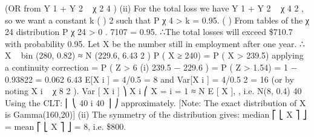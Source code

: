 \documentclass[a4paper,12pt]{article}
\begin{document}
(OR from Y 1 + Y 2 ~ χ 2 4 )
(ii)
For the total loss we have Y 1 + Y 2 ~ χ 4 2 , so we want a constant k
(
)
2
such that P χ 4 > k = 0.95.
(
)
From tables of the χ 24 distribution P χ 24 > 0 . 7107 = 0.95.
∴The total losses will exceed \$710.7 with probability 0.95.
Let X be the number still in employment after one year.
∴ X ~ bin (280, 0.82) ≈ N (229.6, 6.43 2 )
P ( X ≥ 240) = P ( X > 239.5) applying a continuity correction
= P ( Z >
6
(i)
239.5 − 229.6
) = P ( Z > 1.54) = 1 − 0.93822 = 0.062
6.43
E[X i ] = 4/0.5 = 8 and Var[X i ] = 4/0.5 2 = 16 (or by noting X i ~ χ 8 2 ).
Var [ X i ] ⎞
\sigma X i ⎛
X = i = 1 ≈ N E [ X ],
, i.e. N(8, 0.4)
40
Using the CLT:
⎜
⎝
40
i
40
⎟
⎠
approximately.
[Note: The exact distribution of X is Gamma(160,20)]
(ii)
The symmetry of the distribution gives: median ⎡ ⎣ X ⎤ ⎦ = mean ⎡ ⎣ X ⎤ ⎦ = 8,
i.e. \$800.
\end{document}
